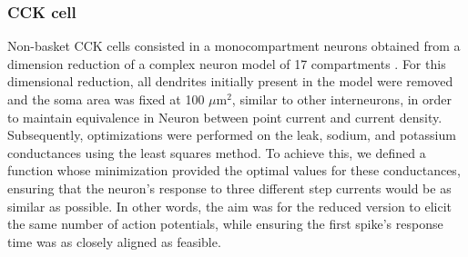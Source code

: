 \documentclass[../main.tex]{subfiles}
\begin{document}
\subsubsection{CCK cell}
Non-basket CCK cells consisted in a monocompartment neurons obtained from a dimension reduction of a complex neuron model of 17 compartments \citep{bilash_lateral_2023}.
For this dimensional reduction, all dendrites initially present in the model were removed and the soma area was fixed at 100 $\mu$m$^2$, similar to other interneurons, in order to maintain equivalence in Neuron between point current and current density.
Subsequently, optimizations were performed on the leak, sodium, and potassium conductances using the least squares method.
To achieve this, we defined a function whose minimization provided the optimal values for these conductances, ensuring that the neuron's response to three different step currents would be as similar as possible. In other words, the aim was for the reduced version to elicit the same number of action potentials, while ensuring the first spike's response time was as closely aligned as feasible.
\end{document}
